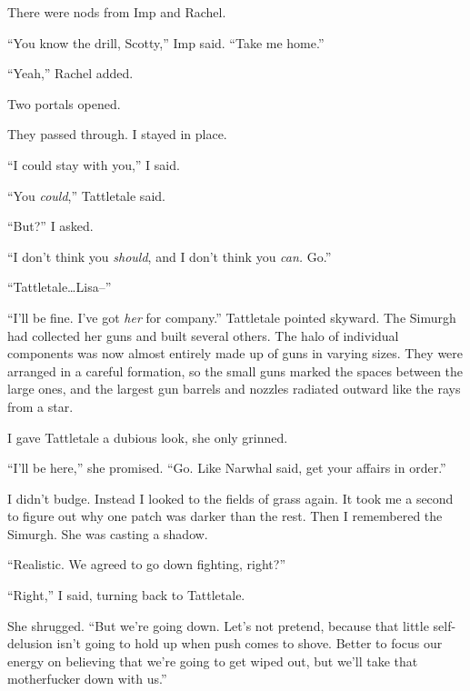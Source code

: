 There were nods from Imp and Rachel.



``You know the drill, Scotty,'' Imp said.  ``Take me home.''



``Yeah,'' Rachel added.



Two portals opened.



They passed through.  I stayed in place.



``I could stay with you,'' I said.



``You \emph{could},'' Tattletale said.



``But?'' I asked.



``I don't think you \emph{should}, and I don't think you \emph{can. } Go.''



``Tattletale\ldots Lisa--''



``I'll be fine.  I've got \emph{her} for company.''  Tattletale pointed skyward.  The Simurgh had collected her guns and built several others.  The halo of individual components was now almost entirely made up of guns in varying sizes.  They were arranged in a careful formation, so the small guns marked the spaces between the large ones, and the largest gun barrels and nozzles radiated outward like the rays from a star.



I gave Tattletale a dubious look, she only grinned.



``I'll be here,'' she promised.  ``Go.  Like Narwhal said, get your affairs in order.''



I didn't budge.  Instead I looked to the fields of grass again.  It took me a second to figure out why one patch was darker than the rest.  Then I remembered the Simurgh.  She was casting a shadow.



``Realistic.  We agreed to go down fighting, right?''



``Right,'' I said, turning back to Tattletale.



She shrugged.  ``But we're going down.  Let's not pretend, because that little self-delusion isn't going to hold up when push comes to shove.  Better to focus our energy on believing that we're going to get wiped out, but we'll take that motherfucker down with us.''



